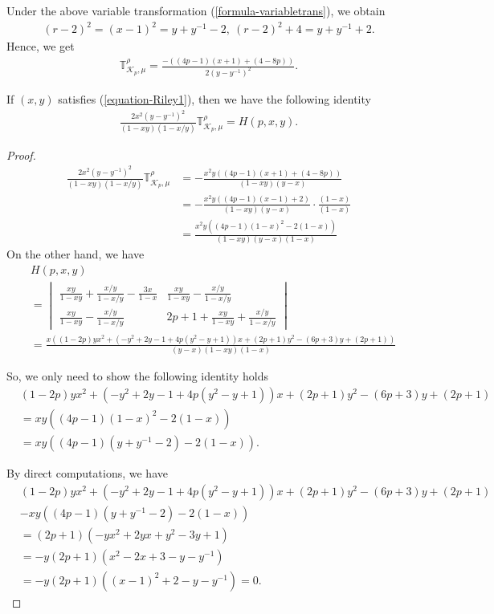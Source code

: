 \documentclass[12pt]{amsart}
\begin{document}
Under the above variable transformation (\ref{formula-variabletrans}), we obtain
\begin{align}
    (r-2)^2=(x-1)^2=y+y^{-1}-2, \ (r-2)^2+4=y+y^{-1}+2.
\end{align}
Hence, we get
\begin{align}
    \mathbb{T}_{\mathcal{K}_p,\mu}^{\rho}=\frac{-((4p-1)(x+1)+(4-8p))}{2(y-y^{-1})^2}.
\end{align}

\begin{theorem} \label{theorem-Rtorsion-identity1}
If $(x,y)$ satisfies (\ref{equation-Riley1}), then we have the following identity
\begin{align}
    \frac{2x^2(y-y^{-1})^2}{(1-xy)(1-x/y)}\mathbb{T}_{\mathcal{K}_p,\mu}^\rho=H(p,x,y).
\end{align}
\end{theorem}
\begin{proof}
\begin{align}
    \frac{2x^2(y-y^{-1})^2}{(1-xy)(1-x/y)}\mathbb{T}_{\mathcal{K}_p,\mu}^\rho&=-\frac{x^2y((4p-1)(x+1)+(4-8p))}{(1-xy)(y-x)} \\\nonumber
    &=-\frac{x^2y((4p-1)(x-1)+2)}{(1-xy)(y-x)}\cdot\frac{(1-x)}{(1-x)}\\\nonumber
    &=\frac{x^2y((4p-1)(1-x)^2-2(1-x))}{(1-xy)(y-x)(1-x)}
\end{align}
On the other hand, we have 
\begin{align}
    &H(p,x,y)\\\nonumber&=\begin{vmatrix}
    \frac{xy}{1-xy}+\frac{x/y}{1-x/y}-\frac{3x}{1-x} & \frac{xy}{1-xy}-\frac{x/y}{1-x/y} \\
    \frac{xy}{1-xy}-\frac{x/y}{1-x/y}  & 2p+1+ \frac{xy}{1-xy}+\frac{x/y}{1-x/y}
    \end{vmatrix}\\\nonumber
    &=\frac{x((1-2p)yx^2+(-y^2+2y-1+4p(y^2-y+1))x+(2p+1)y^2-(6p+3)y+(2p+1))}{(y-x)(1-xy)(1-x)}
\end{align}

So, we only need to show the following identity holds
\begin{align}
    &(1-2p)yx^2+(-y^2+2y-1+4p(y^2-y+1))x+(2p+1)y^2-(6p+3)y+(2p+1)\\\nonumber 
    &=xy((4p-1)(1-x)^2-2(1-x))\\\nonumber
    &=xy((4p-1)(y+y^{-1}-2)-2(1-x)).
\end{align}

By direct computations, we have 
\begin{align}
    &(1-2p)yx^2+(-y^2+2y-1+4p(y^2-y+1))x+(2p+1)y^2-(6p+3)y+(2p+1)\\\nonumber
    &-xy((4p-1)(y+y^{-1}-2)-2(1-x))\\\nonumber
    &=(2p+1)(-yx^2+2yx+y^2-3y+1)\\\nonumber
    &=-y(2p+1)(x^2-2x+3-y-y^{-1})\\\nonumber
    &=-y(2p+1)((x-1)^2+2-y-y^{-1})=0.
\end{align}
\end{proof}
\end{document}
